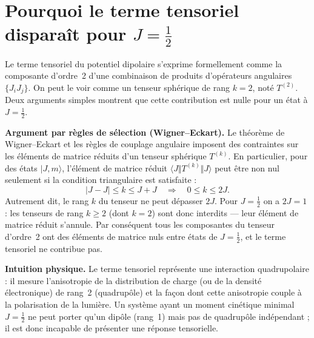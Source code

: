 \chapter[Moment tensoriel pour J=1/2]{Pourquoi le terme tensoriel disparaît pour $J=\tfrac12$}
\label{annex:no_tensor}
\minitoc

Le terme tensoriel du potentiel dipolaire s'exprime formellement comme la composante d'ordre~2 d'une combinaison de produits d'opérateurs angulaires \(\{J_iJ_j\}\). On peut le voir comme un tenseur sphérique de rang \(k=2\), noté \(T^{(2)}\). Deux arguments simples montrent que cette contribution est nulle pour un état à \(J=\tfrac12\).

\medskip

\noindent\textbf{Argument par règles de sélection (Wigner–Eckart).}
Le théorème de Wigner–Eckart et les règles de couplage angulaire imposent des contraintes sur les éléments de matrice réduits d'un tenseur sphérique \(T^{(k)}\). En particulier, pour des états \(|J,m\rangle\), l'élément de matrice réduit \(\langle J\Vert T^{(k)}\Vert J\rangle\) peut être non nul seulement si la condition triangulaire est satisfaite :
\[
|J-J|\le k \le J+J \quad\Longrightarrow\quad 0\le k\le 2J.
\]
Autrement dit, le rang \(k\) du tenseur ne peut dépasser \(2J\). Pour \(J=\tfrac12\) on a \(2J=1\) : les tenseurs de rang \(k\ge2\) (dont \(k=2\)) sont donc interdits — leur élément de matrice réduit s'annule. Par conséquent tous les composantes du tenseur d'ordre~2 ont des éléments de matrice nuls entre états de \(J=\tfrac12\), et le terme tensoriel ne contribue pas.

\medskip

\noindent\textbf{Intuition physique.}
Le terme tensoriel représente une interaction quadrupolaire : il mesure l'anisotropie de la distribution de charge (ou de la densité électronique) de rang~2 (quadrupôle) et la façon dont cette anisotropie couple à la polarisation de la lumière. Un système ayant un moment cinétique minimal \(J=\tfrac12\) ne peut porter qu'un dipôle (rang~1) mais pas de quadrupôle indépendant ; il est donc incapable de présenter une réponse tensorielle.

\medskip

